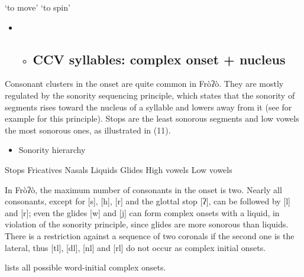 \begin{styleindexi}
                  ‘to move’                                ‘to spin’  
\end{styleindexi}

\begin{itemize}
\item \begin{itemize}
\item \subsection{ CCV syllables: complex onset + nucleus} \end{itemize}
\end{itemize}

Consonant clusters in the onset are quite common in Fròʔò. They are mostly regulated by the sonority sequencing principle, which states that the sonority of segments rises toward the nucleus of a syllable and lowers away from it (see for example \citealt{Clements1990} for this principle). Stops are the least sonorous segments and low vowels the most sonorous ones, as illustrated in (11).

\begin{itemize}
\item \begin{styleindexi}
    \label{bkm:Ref359767369}Sonority hierarchy
\end{styleindexi}\end{itemize}
\begin{styleindexi}
  Stops         Fricatives          Nasals       Liquids       Glides         High vowels        Low vowels
\end{styleindexi}

\begin{styleindexi}
     
\end{styleindexi}

In Fròʔò, the maximum number of consonants in the onset is two. Nearly all consonants, except for [s], [h], [r] and the glottal stop [ʔ], can be followed by [l] and [r]; even the glides [w] and [j] can form complex onsets with a liquid, in violation of the sonority principle, since glides are more sonorous than liquids. There is a restriction against a sequence of two coronals if the second one is the lateral, thus [tl], [dl], [nl] and [rl] do not occur as complex initial onsets.

 lists all possible word-initial complex onsets. 

